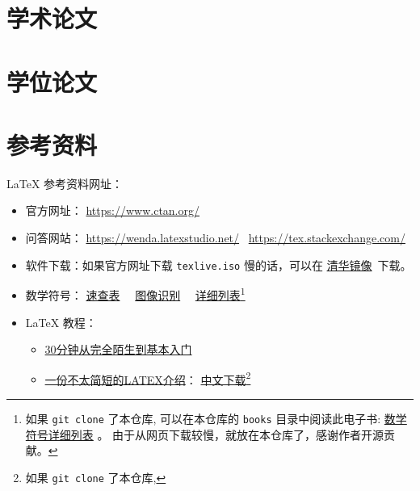 \documentclass[
    11pt,
    base=hide,
    cite=authoryear,
    device=phone,
    lang=cn,
    mode=simple,
    result=answer,
    toc=onecol,
]{elegantbook_sierxue}
\begin{document}
\newpage
\section{学术论文}%
\label{sec:latex-paper}

\newpage
\section{学位论文}%
\label{sec:latex-thesis}

\newpage
\section{参考资料}%
\label{sec:latex-refs}

\LaTeX{} 参考资料网址：
\begin{itemize}
    \item 官方网址： \href{https://www.ctan.org/}{https://www.ctan.org/}
    \item 问答网站：
        \href{https://wenda.latexstudio.net/}{https://wenda.latexstudio.net/}~%
        \href{https://tex.stackexchange.com/}{https://tex.stackexchange.com/}
    \item 软件下载：如果官方网址下载 \lstinline{texlive.iso} 慢的话，可以在
    \href{https://mirrors.tuna.tsinghua.edu.cn/CTAN/systems/texlive/Images/}
                {清华镜像}~下载。
    \item 数学符号： \href{books/latex-math-symbols.pdf}{速查表}~~%
        \href{http://detexify.kirelabs.org/classify.html} {图像识别}~~%
        \href{http://mirrors .ustc.edu.cn/CTAN/info/symbols/comprehensive/symbols-a4.pdf}
        {详细列表}\footnote{
            如果 \lstinline{git clone} 了本仓库,
            可以在本仓库的 \lstinline{books}
            目录中阅读此电子书:
            \href{books/symbols-a4.pdf}{数学符号详细列表} 。
            由于从网页下载较慢，就放在本仓库了，感谢作者开源贡献。
            }
    \item \LaTeX{} 教程：
        \begin{itemize}
            \item \href{https://www.latexstudio.net/archives/9377.html}
                {30分钟从完全陌生到基本入门}
            \item
                \href{https://www.ctan.org/tex-archive/info/lshort/chinese}
                {一份不太简短的LATEX介绍}：
        \href{http://mirrors.ctan.org/info/lshort/chinese/lshort-zh-cn.pdf}
                {中文下载}\footnote{
                    如果 \lstinline{git clone} 了本仓库,
}
\end{itemize}
\end{itemize}
\end{document}
